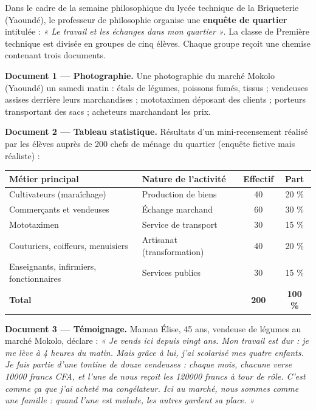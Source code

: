 \documentclass[11pt]{article}
\newcounter{popsec}
\newcounter{popsub}
\newcommand{\courssub}[1]{%
  \stepcounter{popsub}%
  \par\vspace{9pt}\noindent{\popxbold\fontsize{11.5}{13}\selectfont\color{popink}{\color{poporange}\thepopsec.\thepopsub}\hspace{6pt}#1}\par\nopagebreak\vspace{4pt}
}
\begin{document}
\courssub{Situation}

Dans le cadre de la semaine philosophique du lycée technique de la Briqueterie (Yaoundé), le professeur de philosophie organise une \textbf{enquête de quartier} intitulée : \emph{« Le travail et les échanges dans mon quartier »}. La classe de Première technique est divisée en groupes de cinq élèves. Chaque groupe reçoit une chemise contenant trois documents.

\textbf{Document 1 --- Photographie.} Une photographie du marché Mokolo (Yaoundé) un samedi matin : étals de légumes, poissons fumés, tissus ; vendeuses assises derrière leurs marchandises ; mototaximen déposant des clients ; porteurs transportant des sacs ; acheteurs marchandant les prix.

\textbf{Document 2 --- Tableau statistique.} Résultats d'un mini-recensement réalisé par les élèves auprès de 200 chefs de ménage du quartier (enquête fictive mais réaliste) :

\begin{center}
\begin{tabularx}{\linewidth}{|l|X|c|c|}\hline
\rowcolor{popblueL}
\textbf{Métier principal} & \textbf{Nature de l'activité} & \textbf{Effectif} & \textbf{Part} \\ \hline
Cultivateurs (maraîchage) & Production de biens & 40 & 20 \% \\ \hline
Commerçants et vendeuses & Échange marchand & 60 & 30 \% \\ \hline
Mototaximen & Service de transport & 30 & 15 \% \\ \hline
Couturiers, coiffeurs, menuisiers & Artisanat (transformation) & 40 & 20 \% \\ \hline
Enseignants, infirmiers, fonctionnaires & Services publics & 30 & 15 \% \\ \hline
\textbf{Total} & & \textbf{200} & \textbf{100 \%} \\ \hline
\end{tabularx}
\end{center}

\textbf{Document 3 --- Témoignage.} Maman Élise, 45 ans, vendeuse de légumes au marché Mokolo, déclare : \emph{« Je vends ici depuis vingt ans. Mon travail est dur : je me lève à 4 heures du matin. Mais grâce à lui, j'ai scolarisé mes quatre enfants. Je fais partie d'une tontine de douze vendeuses : chaque mois, chacune verse \num{10000} francs CFA, et l'une de nous reçoit les \num{120000} francs à tour de rôle. C'est comme ça que j'ai acheté ma congélateur. Ici au marché, nous sommes comme une famille : quand l'une est malade, les autres gardent sa place. »}
\end{document}
